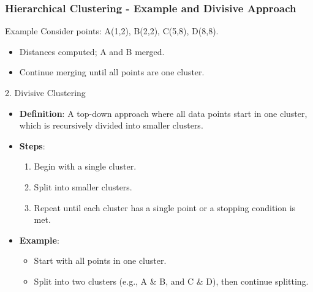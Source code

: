 \documentclass[aspectratio=169]{beamer}
\begin{document}
\begin{frame}[fragile]
  \frametitle{Hierarchical Clustering - Example and Divisive Approach}
  \begin{block}{Example}
    Consider points: A(1,2), B(2,2), C(5,8), D(8,8).
    \begin{itemize}
      \item Distances computed; A and B merged.
      \item Continue merging until all points are one cluster.
    \end{itemize}
  \end{block}

  \begin{block}{2. Divisive Clustering}
    \begin{itemize}
      \item \textbf{Definition}: A top-down approach where all data points start in one cluster, which is recursively divided into smaller clusters.
      \item \textbf{Steps}:
        \begin{enumerate}
          \item Begin with a single cluster.
          \item Split into smaller clusters.
          \item Repeat until each cluster has a single point or a stopping condition is met.
        \end{enumerate}
      \item \textbf{Example}:
        \begin{itemize}
          \item Start with all points in one cluster.
          \item Split into two clusters (e.g., A \& B, and C \& D), then continue splitting.
        \end{itemize}
    \end{itemize}
  \end{block}
\end{frame}
\end{document}
